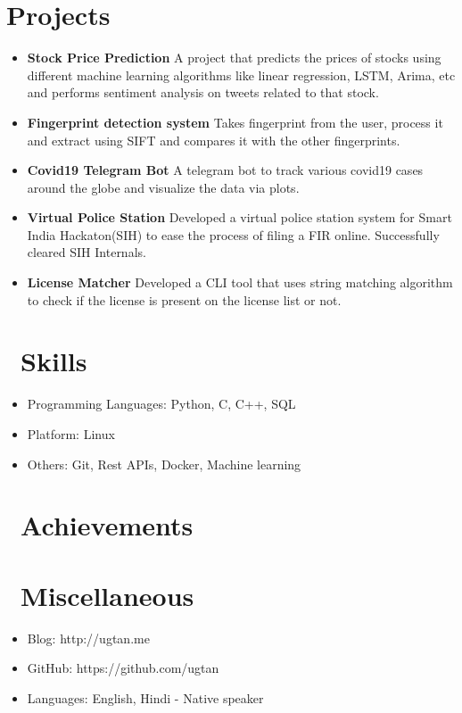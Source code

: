 \documentclass{resume}
\begin{document}
\section{Projects}
\begin{itemize}
  \item \textbf{Stock Price Prediction} A project that predicts the prices of stocks using different machine learning algorithms like linear regression, LSTM, Arima, etc and performs sentiment analysis on tweets related to that stock.
  \item \textbf{Fingerprint detection system} Takes fingerprint from the user, process it and extract using SIFT and compares it with the other fingerprints.
  \item \textbf{Covid19 Telegram Bot} A telegram bot to track various covid19 cases around the globe and visualize the data via plots.
  \item \textbf{Virtual Police Station} Developed a virtual police station system for Smart India Hackaton(SIH) to ease the process of filing a FIR online. Successfully cleared SIH Internals.
  \item \textbf{License Matcher} Developed a CLI tool that uses string matching algorithm to check if the license is present on the license list or not.
\end{itemize}


\section{\faCogs\ Skills}
\begin{itemize}[parsep=0.5ex]
  \item Programming Languages: Python, C, C++, SQL
  \item Platform: Linux
  \item Others: Git, Rest APIs, Docker, Machine learning
\end{itemize}

\section{\faHeartO\ Achievements}

\section{\faInfo\ Miscellaneous}
\begin{itemize}[parsep=0.5ex]
  \item Blog: http://ugtan.me
  \item GitHub: https://github.com/ugtan
  \item Languages: English, Hindi - Native speaker
\end{itemize}

%
%
\end{document}
